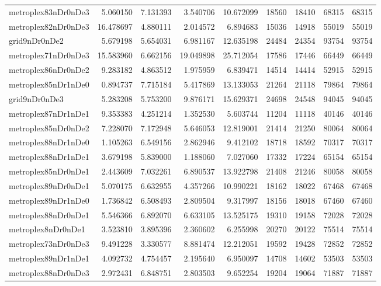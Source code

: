 \begin{longtable}{|l|r|r|r|r|r|r|r|r|}
metroplex83nDr0nDe3 & 5.060150 & 7.131393 & 3.540706 & 10.672099 & 18560 & 18410 & 68315 & 68315 \\
metroplex82nDr0nDe3 & 16.478697 & 4.880111 & 2.014572 & 6.894683 & 15036 & 14918 & 55019 & 55019 \\
grid9nDr0nDe2 & 5.679198 & 5.654031 & 6.981167 & 12.635198 & 24484 & 24354 & 93754 & 93754 \\
metroplex71nDr0nDe3 & 15.583960 & 6.662156 & 19.049898 & 25.712054 & 17586 & 17446 & 66449 & 66449 \\
metroplex86nDr0nDe2 & 9.283182 & 4.863512 & 1.975959 & 6.839471 & 14514 & 14414 & 52915 & 52915 \\
metroplex85nDr1nDe0 & 0.894737 & 7.715184 & 5.417869 & 13.133053 & 21264 & 21118 & 79864 & 79864 \\
grid9nDr0nDe3 & 5.283208 & 5.753200 & 9.876171 & 15.629371 & 24698 & 24548 & 94045 & 94045 \\
metroplex87nDr1nDe1 & 9.353383 & 4.251214 & 1.352530 & 5.603744 & 11204 & 11118 & 40146 & 40146 \\
metroplex85nDr0nDe2 & 7.228070 & 7.172948 & 5.646053 & 12.819001 & 21414 & 21250 & 80064 & 80064 \\
metroplex88nDr1nDe0 & 1.105263 & 6.549156 & 2.862946 & 9.412102 & 18718 & 18592 & 70317 & 70317 \\
metroplex88nDr1nDe1 & 3.679198 & 5.839000 & 1.188060 & 7.027060 & 17332 & 17224 & 65154 & 65154 \\
metroplex85nDr0nDe1 & 2.443609 & 7.032261 & 6.890537 & 13.922798 & 21408 & 21246 & 80058 & 80058 \\
metroplex89nDr0nDe1 & 5.070175 & 6.632955 & 4.357266 & 10.990221 & 18162 & 18022 & 67468 & 67468 \\
metroplex89nDr1nDe0 & 1.736842 & 6.508493 & 2.809504 & 9.317997 & 18156 & 18018 & 67460 & 67460 \\
metroplex88nDr0nDe1 & 5.546366 & 6.892070 & 6.633105 & 13.525175 & 19310 & 19158 & 72028 & 72028 \\
metroplex8nDr0nDe1 & 3.523810 & 3.895396 & 2.360602 & 6.255998 & 20270 & 20122 & 75514 & 75514 \\
metroplex73nDr0nDe3 & 9.491228 & 3.330577 & 8.881474 & 12.212051 & 19592 & 19428 & 72852 & 72852 \\
metroplex89nDr1nDe1 & 4.092732 & 4.754457 & 2.195640 & 6.950097 & 14708 & 14602 & 53503 & 53503 \\
metroplex88nDr0nDe3 & 2.972431 & 6.848751 & 2.803503 & 9.652254 & 19204 & 19064 & 71887 & 71887 \\

\end{longtable}
